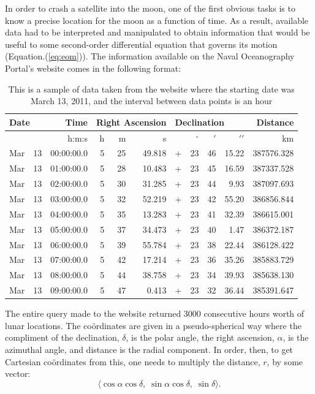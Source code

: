\documentclass{article}
\begin{document}
In order to crash a satellite into the moon, one of the first obvious
tasks is to know a precise location for the moon as a function of
time.
As a result, available data had to be interpreted and manipulated to
obtain information that would be useful to some second-order
differential equation that governs its motion (Equation.(\ref{eq:eom})).
The information available on the Naval Oceanography Portal's
website \cite{USNO}
comes in the following format:
\\
\noindent
\begin{table}[H]\centering
\begin{tabular}{r r r r r r r r r r r}
  \multicolumn{2}{l}{Date} & Time & \multicolumn{3}{l}{Right Ascension} &
  \multicolumn{4}{l}{Declination} & Distance \\ 
  \hline
  & & h:m:s & h & m & s & & $^\circ$ & $\prime$ & $\prime\prime$ & km
  \\ 
  Mar & 13 & 00:00:00.0 & 5 & 25 & 49.818 & + & 23 & 46 & 15.22 &
  387576.328 \\
  Mar & 13 & 01:00:00.0 & 5 & 28 & 10.483 & + & 23 & 45 & 16.59 &
  387337.528 \\
  Mar & 13 & 02:00:00.0 & 5 & 30 & 31.285 & + & 23 & 44 & 9.93 &
  387097.693 \\
  Mar & 13 & 03:00:00.0 & 5 & 32 & 52.219 & + & 23 & 42 & 55.20 &
  386856.844 \\
  Mar & 13 & 04:00:00.0 & 5 & 35 & 13.283 & + & 23 & 41 & 32.39 &
  386615.001 \\
  Mar & 13 & 05:00:00.0 & 5 & 37 & 34.473 & + & 23 & 40 & 1.47 &
  386372.187 \\
  Mar & 13 & 06:00:00.0 & 5 & 39 & 55.784 & + & 23 & 38 & 22.44 &
  386128.422 \\
  Mar & 13 & 07:00:00.0 & 5 & 42 & 17.214 & + & 23 & 36 & 35.26 &
  385883.729 \\
  Mar & 13 & 08:00:00.0 & 5 & 44 & 38.758 & + & 23 & 34 & 39.93 &
  385638.130 \\
  Mar & 13 & 09:00:00.0 & 5 & 47 & 0.413 & + & 23 & 32 & 36.44 &
  385391.647 \\
\end{tabular}
\caption{This is a sample of data taken from the website where the
  starting date was March 13, 2011, and the interval between data points
  is an hour}
\label{tab:sampledata}  
\end{table}

The entire query made to the website returned 3000 consecutive hours worth
of lunar locations.
The co\"ordinates are given in a pseudo-spherical way where the
compliment of the declination, $\delta$, is the polar angle, the right
ascension, $\alpha$, is the azimuthal angle, and distance is the radial
component. In order, then, to get Cartesian co\"ordinates from this,
one needs to multiply the distance, $r$, by some vector:
\begin{equation}
  \langle \cos{\alpha}\cos{\delta}, \; \sin{\alpha}\cos{\delta}, \;
  \sin{\delta} \rangle.
\end{equation}
\end{document}
